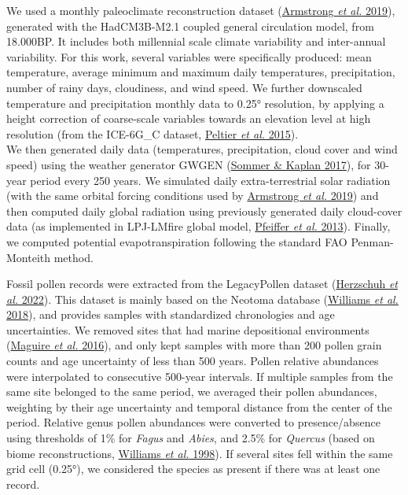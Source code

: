 \documentclass[11pt,]{article}
\begin{document}
We used a monthly paleoclimate reconstruction dataset
(\protect\hyperlink{ref-Armstrong2019}{Armstrong \emph{et al.} 2019}),
generated with the HadCM3B-M2.1 coupled general circulation model, from
18.000BP. It includes both millennial scale climate variability and
inter-annual variability. For this work, several variables were
specifically produced: mean temperature, average minimum and maximum
daily temperatures, precipitation, number of rainy days, cloudiness, and
wind speed. We further downscaled temperature and precipitation monthly
data to 0.25° resolution, by applying a height correction of
coarse-scale variables towards an elevation level at high resolution
(from the ICE-6G\_C dataset, \protect\hyperlink{ref-Peltier2015}{Peltier
\emph{et al.} 2015}).\\
We then generated daily data (temperatures, precipitation, cloud cover
and wind speed) using the weather generator GWGEN
(\protect\hyperlink{ref-Sommer2017}{Sommer \& Kaplan 2017}), for 30-year
period every 250 years. We simulated daily extra-terrestrial solar
radiation (with the same orbital forcing conditions used by
\protect\hyperlink{ref-Armstrong2019}{Armstrong \emph{et al.} 2019}) and
then computed daily global radiation using previously generated daily
cloud-cover data (as implemented in LPJ-LMfire global model,
\protect\hyperlink{ref-Pfeiffer2013}{Pfeiffer \emph{et al.} 2013}).
Finally, we computed potential evapotranspiration following the standard
FAO Penman-Monteith method.

Fossil pollen records were extracted from the LegacyPollen dataset
(\protect\hyperlink{ref-Herzschuh2022}{Herzschuh \emph{et al.} 2022}).
This dataset is mainly based on the Neotoma database
(\protect\hyperlink{ref-Williams2018}{Williams \emph{et al.} 2018}), and
provides samples with standardized chronologies and age uncertainties.
We removed sites that had marine depositional environments
(\protect\hyperlink{ref-Maguire2016}{Maguire \emph{et al.} 2016}), and
only kept samples with more than 200 pollen grain counts and age
uncertainty of less than 500 years. Pollen relative abundances were
interpolated to consecutive 500-year intervals. If multiple samples from
the same site belonged to the same period, we averaged their pollen
abundances, weighting by their age uncertainty and temporal distance
from the center of the period. Relative genus pollen abundances were
converted to presence/absence using thresholds of 1\% for \emph{Fagus}
and \emph{Abies}, and 2.5\% for \emph{Quercus} (based on biome
reconstructions, \protect\hyperlink{ref-Williams1998}{Williams \emph{et
al.} 1998}). If several sites fell within the same grid cell (0.25°), we
considered the species as present if there was at least one record.
\end{document}
